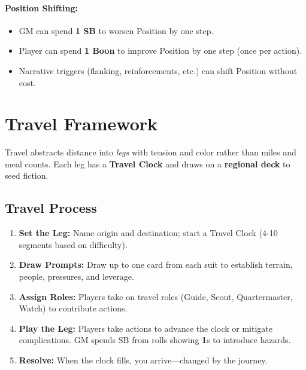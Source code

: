 \paragraph{Position Shifting:}
\begin{itemize}
\item GM can spend \textbf{1 SB} to worsen Position by one step.
\item Player can spend \textbf{1 Boon} to improve Position by one step (once per action).
\item Narrative triggers (flanking, reinforcements, etc.) can shift Position without cost.
\end{itemize}

\section{Travel Framework}

Travel abstracts distance into \emph{legs} with tension and color rather than miles and meal counts. Each leg has a \textbf{Travel Clock} and draws on a \textbf{regional deck} to seed fiction.

\subsection*{Travel Process}
\begin{enumerate}
\item \textbf{Set the Leg:} Name origin and destination; start a Travel Clock (4-10 segments based on difficulty).
\item \textbf{Draw Prompts:} Draw up to one card from each suit to establish terrain, people, pressures, and leverage.
\item \textbf{Assign Roles:} Players take on travel roles (Guide, Scout, Quartermaster, Watch) to contribute actions.
\item \textbf{Play the Leg:} Players take actions to advance the clock or mitigate complications. GM spends SB from rolls showing \textbf{1}s to introduce hazards.
\item \textbf{Resolve:} When the clock fills, you arrive—changed by the journey.
\end{enumerate}

